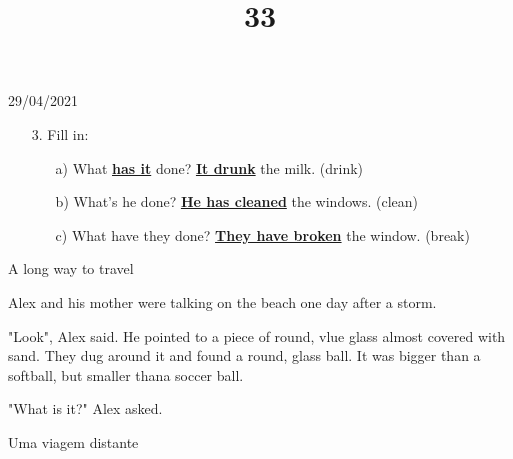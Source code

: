 \documentclass{SchoolBook}
\begin{document}
    \begin{day}{29/04/2021}
        \begin{enumerate}
            \item[3.] Fill in:
            \begin{enumerate}[nosep]
                \item[a)] What {\bf\underline{has it}} done? {\bf\underline{It drunk}} the milk. (drink)
                \item[b)] What's he done? {\bf\underline{He has cleaned}} the windows. (clean)
                \item[c)] What have they done? {\bf\underline{They have broken}} the window. (break)
            \end{enumerate}
        \end{enumerate}
        
        \begin{multicols}{2}
            \title{3}{A long way to travel}
        
            Alex and his mother were talking on the beach one day after a storm.
            
            "Look", Alex said. He pointed to a piece of round, vlue glass almost covered with sand. They dug around it and found a round, glass ball. It was bigger than a softball, but smaller thana soccer ball.
            
            "What is it?" Alex asked.
            
            \vfill\columnbreak
            
            \title{3}{Uma viagem distante}
            
        
        \end{multicols}
    \end{day}
    
\end{document}
